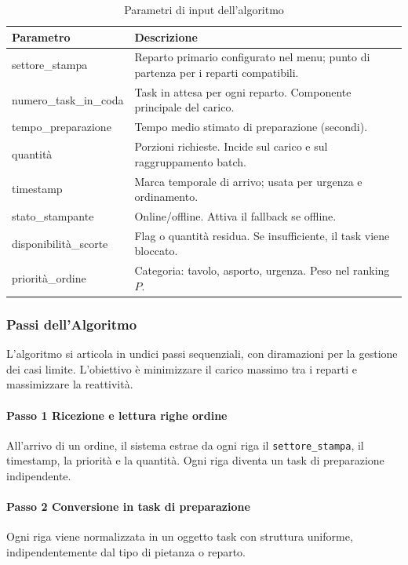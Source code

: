 \begin{table}[H]
\centering
\caption{Parametri di input dell'algoritmo}
\label{tab:parametri}
\begin{tabular}{>{\ttfamily}lp{9cm}}
\toprule
\normalfont\textbf{Parametro} & \textbf{Descrizione} \\
\midrule
settore\_stampa        & Reparto primario configurato nel menu; punto di partenza per i reparti compatibili. \\
numero\_task\_in\_coda & Task in attesa per ogni reparto. Componente principale del carico. \\
tempo\_preparazione    & Tempo medio stimato di preparazione (secondi). \\
quantità               & Porzioni richieste. Incide sul carico e sul raggruppamento batch. \\
timestamp              & Marca temporale di arrivo; usata per urgenza e ordinamento. \\
stato\_stampante       & Online/offline. Attiva il fallback se offline. \\
disponibilità\_scorte  & Flag o quantità residua. Se insufficiente, il task viene bloccato. \\
priorità\_ordine       & Categoria: tavolo, asporto, urgenza. Peso nel ranking $P$. \\
\bottomrule
\end{tabular}
\end{table}

\subsubsection*{Passi dell'Algoritmo}

L'algoritmo si articola in undici passi sequenziali, con diramazioni per la gestione
dei casi limite. L'obiettivo è minimizzare il carico massimo tra i reparti e
massimizzare la reattività.

\paragraph{Passo 1  Ricezione e lettura righe ordine}
All'arrivo di un ordine, il sistema estrae da ogni riga il \texttt{settore\_stampa},
il timestamp, la priorità e la quantità. Ogni riga diventa un task di preparazione
indipendente.

\paragraph{Passo 2  Conversione in task di preparazione}
Ogni riga viene normalizzata in un oggetto task con struttura uniforme,
indipendentemente dal tipo di pietanza o reparto.

